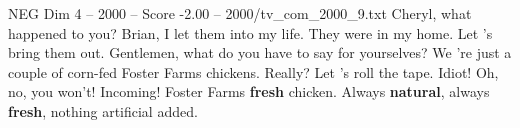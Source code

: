 \begin{textsample}{NEG Dim 4 – 2000 – Score -2.00 – 2000/tv\_com\_2000\_9.txt}  \label{ex:f4_neg_022}
Cheryl, what happened to you?
Brian, I let them into my life.
They were in my home.
Let 's bring them out.
Gentlemen, what do you have to say for yourselves?
We 're just a couple of corn-fed Foster Farms chickens.
Really?
Let 's roll the tape.
Idiot!
Oh, no, you won't!
Incoming!
Foster Farms \textbf{fresh} chicken.
Always \textbf{natural}, always \textbf{fresh}, nothing artificial added.

\end{textsample}
